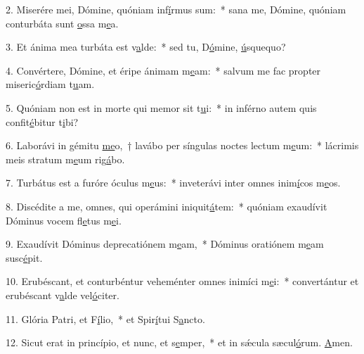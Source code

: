 2. Miserére mei, Dómine, quóniam inf\uline{í}rmus sum:~* sana me, Dómine, quóniam conturbáta sunt \uline{o}ssa m\uline{e}a.\par 
3. Et ánima mea turbáta est v\uline{a}lde:~* sed tu, D\uline{ó}mine, \uline{ú}squequo?\par 
4. Convértere, Dómine, et éripe ánimam m\uline{e}am:~* salvum me fac propter miseric\uline{ó}rdiam t\uline{u}am.\par 
5. Quóniam non est in morte qui memor sit t\uline{u}i:~* in inférno autem quis confit\uline{é}bitur t\uline{i}bi?\par 
6. Laborávi in gémitu \uline{me}o,~† lavábo per síngulas noctes lectum m\uline{e}um:~* lácrimis meis stratum m\uline{e}um rig\uline{á}bo.\par 
7. Turbátus est a furóre óculus m\uline{e}us:~* inveterávi inter omnes inim\uline{í}cos m\uline{e}os.\par 
8. Discédite a me, omnes, qui operámini iniquit\uline{á}tem:~* quóniam exaudívit Dóminus vocem fl\uline{e}tus m\uline{e}i.\par 
9. Exaudívit Dóminus deprecatiónem m\uline{e}am,~* Dóminus oratiónem m\uline{e}am susc\uline{é}pit.\par 
10. Erubéscant, et conturbéntur veheménter omnes inimíci m\uline{e}i:~* convertántur et erubéscant v\uline{a}lde vel\uline{ó}citer.\par 
11. Glória Patri, et F\uline{í}lio,~* et Spir\uline{í}tui S\uline{a}ncto.\par 
12. Sicut erat in princípio, et nunc, et s\uline{e}mper,~* et in sǽcula sæcul\uline{ó}rum. \uline{A}men.\par 
